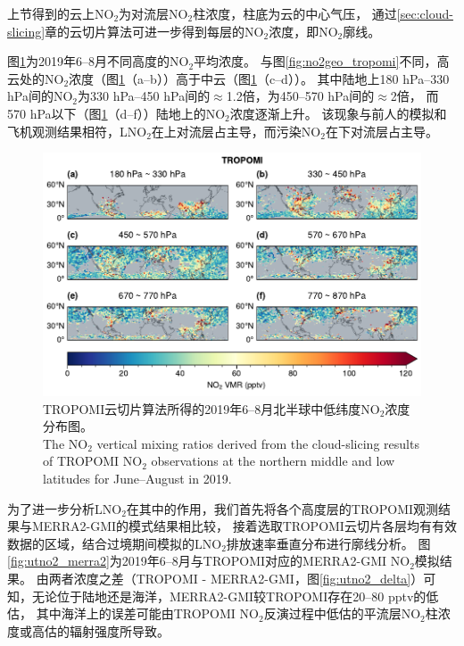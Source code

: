 上节得到的云上NO$_2$为对流层NO$_2$柱浓度，柱底为云的中心气压，
通过\ref{sec:cloud-slicing}章的云切片算法可进一步得到每层的NO$_2$浓度，即NO$_2$廓线。

图\ref{fig:utno2_tropomi}为2019年6--8月不同高度的NO$_2$平均浓度。
与图\ref{fig:no2geo_tropomi}不同，高云处的NO$_2$浓度（图\ref{fig:utno2_tropomi}（a--b））高于中云（图\ref{fig:utno2_tropomi}（c--d））。
其中陆地上180 hPa--330 hPa间的NO$_2$为330 hPa--450 hPa间的$\approx$1.2倍，为450--570 hPa间的$\approx$2倍，
而570 hPa以下（图\ref{fig:utno2_tropomi}（d--f））陆地上的NO$_2$浓度逐渐上升。
该现象与前人的模拟和飞机观测结果相符，LNO$_2$在上对流层占主导，而污染NO$_2$在下对流层占主导\citep{Pickering.1996,Ott.2010,Laughner.2017}。


\begin{figure}[!htbp]
    \centering
    \includegraphics[width=15cm]{./figures/utno2_tropomi.pdf}
    \caption{
    TROPOMI云切片算法所得的2019年6--8月北半球中低纬度NO$_2$浓度分布图。 \\
    The NO$_2$ vertical mixing ratios derived from the cloud-slicing results of TROPOMI NO$_2$ observations at the northern middle and low latitudes for June--August in 2019.
    }
    \label{fig:utno2_tropomi}
\end{figure}


为了进一步分析LNO$_2$在其中的作用，我们首先将各个高度层的TROPOMI观测结果与MERRA2-GMI的模式结果相比较，
接着选取TROPOMI云切片各层均有有效数据的区域，结合过境期间模拟的LNO$_2$排放速率垂直分布进行廓线分析。
图\ref{fig:utno2_merra2}为2019年6--8月与TROPOMI对应的MERRA2-GMI NO$_2$模拟结果。
由两者浓度之差（TROPOMI - MERRA2-GMI，图\ref{fig:utno2_delta}）可知，无论位于陆地还是海洋，MERRA2-GMI较TROPOMI存在20--80 pptv的低估，
其中海洋上的误差可能由TROPOMI NO$_2$反演过程中低估的平流层NO$_2$柱浓度或高估的辐射强度所导致\citep{VanGeffen.2020}。


